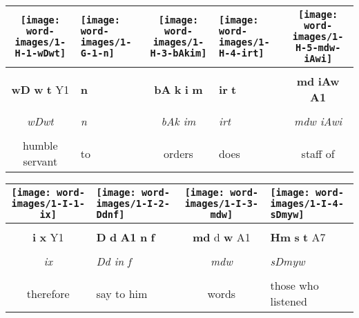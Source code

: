 \begin{tabularx}{\linewidth}{cYcYc}
	\texttt{[image: word-images/1-H-1-wDwt]} &
	\hspace*{-2mm}\texttt{[image: word-images/1-G-1-n]} &
	\texttt{[image: word-images/1-H-3-bAkim]} &
	\hspace*{-4mm} \texttt{[image: word-images/1-H-4-irt]} &
	\texttt{[image: word-images/1-H-5-mdw-iAwi]} \\
	\hline \\ 
	\textbf{wD} \textbf{w} \textbf{t} Y1 &
	\textbf{n} &
	\textbf{bA} \textbf{k} \textbf{i} \textbf{m} &
	\textbf{ir} \textbf{t} &
	\textbf{md} \textbf{iAw} \textbf{A1} \\
	\hline \\ 
	\textit{wDwt} & \textit{n} & \textit{bAk im} & \textit{irt} & \textit{mdw iAwi} \\
	\hline \\ 
	humble servant & to & orders & \hspace*{-4mm}does & staff of 
\end{tabularx}

\vspace{7.5mm}

\begin{tabularx}{\linewidth}{cYcY}
	\hspace*{-2mm}\texttt{[image: word-images/1-I-1-ix]} &
	\hspace*{-15mm} \texttt{[image: word-images/1-I-2-Ddnf]} &
	\hspace*{-13mm}\texttt{[image: word-images/1-I-3-mdw]} &
	\hspace*{-6mm} \texttt{[image: word-images/1-I-4-sDmyw]} \\
	\hline \\ 
	\textbf{i} \textbf{x} Y1 &
	\hspace*{-4mm} \textbf{D} \textbf{d} \textbf{A1} \textbf{n} \textbf{f} &
	\textbf{md} d \textbf{w} A1 &
	\textbf{Hm} \textbf{s} \textbf{t} A7 \\
	\hline \\ 
	\textit{ix} & \hspace*{-4mm} \textit{Dd in f} & \textit{mdw} & \textit{sDmyw} \\
	\hline \\ 
	therefore & \hspace*{-4mm} say to him & words & \hspace*{-4mm} those who listened
\end{tabularx}

\vspace*{\fill}

\pagebreak

